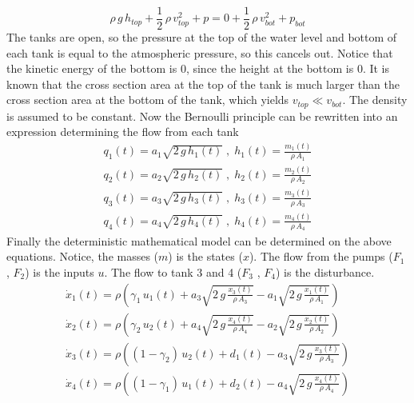 \begin{equation}
    \rho\,g\,h_{top}+\frac{1}{2}\,\rho\,v^2_{top}+p=0+\frac{1}{2}\,\rho\,v^2_{bot}+p_{bot}
    \label{eq:Bernoulli}
\end{equation}
The tanks are open, so the pressure at the top of the water level and bottom of each tank is equal to the atmospheric pressure, so this cancels out. Notice that the kinetic energy of the bottom is 0, since the height at the bottom is 0. It is known that the cross section area at the top of the tank is much larger than the cross section area at the bottom of the tank, which yields $v_{top}\ll v_{bot}$. The density is assumed to be constant. Now the Bernoulli principle can be rewritten into an expression determining the flow from each tank
\begin{equation}
    \begin{gathered}
        q_1(t)=a_1\sqrt{2\,g\,h_1(t)}\;,\;h_1(t)=\frac{m_1(t)}{\rho\,A_1}\\
        q_2(t)=a_2\sqrt{2\,g\,h_2(t)}\;,\;h_2(t)=\frac{m_2(t)}{\rho\,A_2}\\
        q_3(t)=a_3\sqrt{2\,g\,h_3(t)}\;,\;h_3(t)=\frac{m_3(t)}{\rho\,A_3}\\
        q_4(t)=a_4\sqrt{2\,g\,h_4(t)}\;,\;h_4(t)=\frac{m_4(t)}{\rho\,A_4}
    \end{gathered}
\end{equation}
Finally the deterministic mathematical model can be determined on the above equations. Notice, the masses ($m$) is the states ($x$). The flow from the pumps ($F_1$ , $F_2$) is the inputs $u$. The flow to tank 3 and 4 ($F_3$ , $F_4$) is the disturbance. 
\begin{equation}
    \begin{gathered}
        \dot{x}_1(t)=\rho\left(\gamma_1\,u_1(t)+a_3\sqrt{2\,g\,\frac{x_3(t)}{\rho\,A_3}}-a_1\sqrt{2\,g\,\frac{x_1(t)}{\rho\,A_1}}\right)\\
        \dot{x}_2(t)=\rho\left(\gamma_2\,u_2(t)+a_4\sqrt{2\,g\,\frac{x_4(t)}{\rho\,A_4}}-a_2\sqrt{2\,g\,\frac{x_2(t)}{\rho\,A_2}}\right)\\
        \dot{x}_3(t)=\rho\left((1-\gamma_2)\,u_2(t)+d_1(t)-a_3\sqrt{2\,g\,\frac{x_3(t)}{\rho\,A_3}}\right)\\
        \dot{x}_4(t)=\rho\left((1-\gamma_1)\,u_1(t)+d_2(t)-a_4\sqrt{2\,g\,\frac{x_4(t)}{\rho\,A_4}}\right)\\
    \end{gathered}
    \label{eq:States}
\end{equation}

